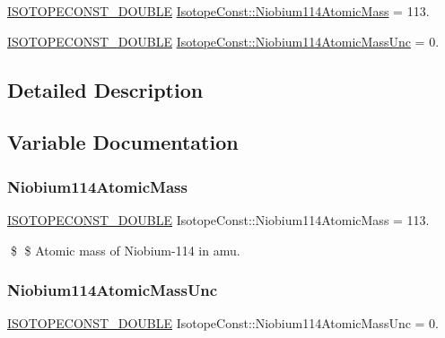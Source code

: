 \begin{DoxyCompactItemize}
\item 
\mbox{\hyperlink{group___isotope_const-_macros_ga8f45a7272ce02c0b4c65c44636ed719a}{I\+S\+O\+T\+O\+P\+E\+C\+O\+N\+S\+T\+\_\+\+D\+O\+U\+B\+LE}} \mbox{\hyperlink{group___isotope_const-_niobium-_nb114_gaa65424635173a1ac88d23d22e2d43662}{Isotope\+Const\+::\+Niobium114\+Atomic\+Mass}} = 113.
\item 
\mbox{\hyperlink{group___isotope_const-_macros_ga8f45a7272ce02c0b4c65c44636ed719a}{I\+S\+O\+T\+O\+P\+E\+C\+O\+N\+S\+T\+\_\+\+D\+O\+U\+B\+LE}} \mbox{\hyperlink{group___isotope_const-_niobium-_nb114_ga1c3109fb2ca14979057c0b1f0382abf7}{Isotope\+Const\+::\+Niobium114\+Atomic\+Mass\+Unc}} = 0.
\end{DoxyCompactItemize}


\subsection{Detailed Description}


\subsection{Variable Documentation}
\mbox{\label{group___isotope_const-_niobium-_nb114_gaa65424635173a1ac88d23d22e2d43662}} 
\subsubsection{\texorpdfstring{Niobium114\+Atomic\+Mass}{Niobium114AtomicMass}}
{\footnotesize\ttfamily \mbox{\hyperlink{group___isotope_const-_macros_ga8f45a7272ce02c0b4c65c44636ed719a}{I\+S\+O\+T\+O\+P\+E\+C\+O\+N\+S\+T\+\_\+\+D\+O\+U\+B\+LE}} Isotope\+Const\+::\+Niobium114\+Atomic\+Mass = 113.}

\$ \$ Atomic mass of Niobium-\/114 in amu. \mbox{\label{group___isotope_const-_niobium-_nb114_ga1c3109fb2ca14979057c0b1f0382abf7}} 
\subsubsection{\texorpdfstring{Niobium114\+Atomic\+Mass\+Unc}{Niobium114AtomicMassUnc}}
{\footnotesize\ttfamily \mbox{\hyperlink{group___isotope_const-_macros_ga8f45a7272ce02c0b4c65c44636ed719a}{I\+S\+O\+T\+O\+P\+E\+C\+O\+N\+S\+T\+\_\+\+D\+O\+U\+B\+LE}} Isotope\+Const\+::\+Niobium114\+Atomic\+Mass\+Unc = 0.}

